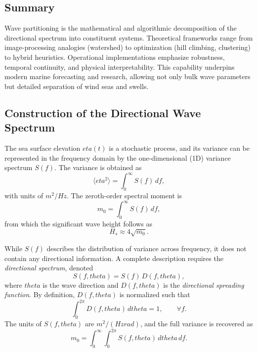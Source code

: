 \documentclass[journal,10pt,twocolumn]{IEEEtran}
\def\eta{eta}%
\def\theta{theta}%
\def\mathrm#1{#1}%
\def\cdot{}%
\begin{document}
    \subsection{Summary}
    Wave partitioning is the mathematical and algorithmic decomposition of the directional spectrum into constituent systems. Theoretical frameworks range from image-processing analogies (watershed) to optimization (hill climbing, clustering) to hybrid heuristics. Operational implementations emphasize robustness, temporal continuity, and physical interpretability. This capability underpins modern marine forecasting and research, allowing not only bulk wave parameters but detailed separation of wind seas and swells.

    \subsection{Construction of the Directional Wave Spectrum}
    \label{subsec:directional-spectrum}

    The sea surface elevation $\eta(t)$ is a stochastic process, and its variance can be represented in the frequency domain by the one-dimensional (1D) variance spectrum $S(f)$. The variance is obtained as
    \begin{equation}
        \langle \eta^2 \rangle = \int_{0}^{\infty} S(f)\, df,
    \end{equation}
    with units of $\mathrm{m}^2/\mathrm{Hz}$. The zeroth-order spectral moment is
    \begin{equation}
        m_0 = \int_{0}^{\infty} S(f)\, df,
    \end{equation}
    from which the significant wave height follows as
    \begin{equation}
        H_s \approx 4 \sqrt{m_0}.
    \end{equation}

    While $S(f)$ describes the distribution of variance across frequency, it does not contain any directional information. A complete description requires the \emph{directional spectrum}, denoted
    \begin{equation}
        S(f,\theta) = S(f)\, D(f,\theta),
    \end{equation}
    where $\theta$ is the wave direction and $D(f,\theta)$ is the \emph{directional spreading function}. By definition, $D(f,\theta)$ is normalized such that
    \begin{equation}
        \int_{0}^{2\pi} D(f,\theta)\, d\theta = 1, \qquad \forall f.
    \end{equation}
    The units of $S(f,\theta)$ are $\mathrm{m}^2 / (\mathrm{Hz}\cdot \mathrm{rad})$, and the full variance is recovered as
    \begin{equation}
        m_0 = \int_{0}^{\infty}\int_{0}^{2\pi} S(f,\theta)\, d\theta\, df.
    \end{equation}
\end{document}
